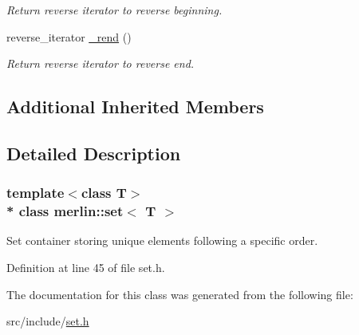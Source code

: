 \begin{DoxyCompactItemize}
\begin{DoxyCompactList}\small\item\em Return reverse iterator to reverse beginning. \end{DoxyCompactList}\item 
reverse\+\_\+iterator \hyperlink{classmerlin_1_1set_a5ab9d534c39d7ae4875598e2ee4b9174}{\+\_\+rend} ()\hypertarget{classmerlin_1_1set_a5ab9d534c39d7ae4875598e2ee4b9174}{}\label{classmerlin_1_1set_a5ab9d534c39d7ae4875598e2ee4b9174}

\begin{DoxyCompactList}\small\item\em Return reverse iterator to reverse end. \end{DoxyCompactList}\end{DoxyCompactItemize}
\subsection*{Additional Inherited Members}


\subsection{Detailed Description}
\subsubsection*{template$<$class T$>$\\*
class merlin\+::set$<$ T $>$}

Set container storing unique elements following a specific order. 

Definition at line 45 of file set.\+h.



The documentation for this class was generated from the following file\+:\begin{DoxyCompactItemize}
\item 
src/include/\hyperlink{set_8h}{set.\+h}\end{DoxyCompactItemize}
